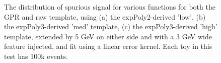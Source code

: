 \begin{figure} 
\begin{center}

\caption{The distribution of spurious signal for various functions for both the GPR and raw template, using (a) the expPoly2-derived 'low', (b) the expPoly3-derived 'med' template, (c) the expPoly3-derived 'high' template, extended by 5 GeV on either side and with a 3 GeV wide feature injected, and fit using a linear error kernel. Each toy in this test has 100k events.}
\label{fig:linearkernel_lowpt_100k_Sig}
\end{center}
\end{figure}

